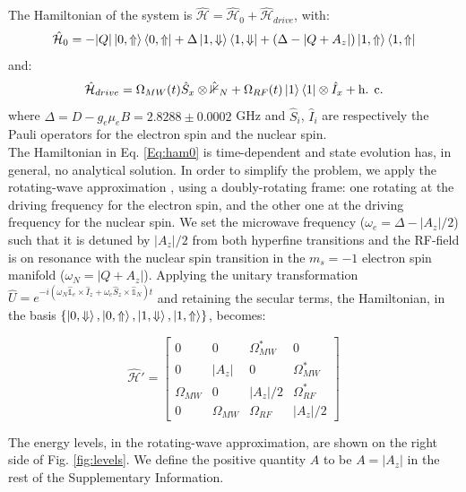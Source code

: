 The Hamiltonian of the system is $\mathcal{\hat{H}}=\mathcal{\hat{H}}_0 +\mathcal{\hat{H}}_{drive}$, with:
\begin{equation}
 \mathcal{\hat{H}}_0 = -|Q| \left|0, \Uparrow\right> \left<0, \Uparrow\right| + \Delta \left|1, \Downarrow\right> \left<1, \Downarrow\right|+(\Delta-|Q+A_z|)\left|1, \Uparrow\right> \left<1, \Uparrow\right|
\end{equation}
and:
\begin{equation}
 \mathcal{\hat{H}}_{drive} = \Omega_{MW} (t)  \hat{S}_{x} \otimes \mathbb{\hat{1}}_N  + \Omega_{RF} (t) \left|1\right>\left<1\right| \otimes \hat{I}_x + \mbox{h. c.}
 \label{Eq:ham0}
\end{equation}
where $\Delta= D -g_e \mu_eB = 2.8288 \pm 0.0002$  GHz and $\hat{S}_i$, $\hat{I}_i$ are respectively the Pauli operators for the electron spin and the nuclear spin. \\

The Hamiltonian in Eq. \ref{Eq:ham0} is time-dependent and state evolution has, in general, no analytical solution. In order to simplify the problem, we apply the rotating-wave approximation \cite{Slichter__1996}, using a doubly-rotating frame: one rotating at the driving frequency for the electron spin, and the other one at the driving frequency for the nuclear spin. We set the microwave  frequency ($\omega_e = \Delta-|A_z|/2$) such that it is detuned by $|A_z|/2$ from both hyperfine transitions and the RF-field is on resonance with the nuclear spin transition in the $m_s=-1$ electron spin manifold ($\omega_N = |Q+A_z|$). Applying the unitary transformation $\hat{U} = e^{-i \left( \omega_N \mathbb{\hat{1}}_e \times \hat{I}_z + \omega_e \hat{S}_z \times \mathbb{\hat{1}}_N \right) t}$ and retaining the secular terms, the Hamiltonian, in the basis $\{ \left|0, \Downarrow\right>, \left|0, \Uparrow\right>, \left|1, \Downarrow\right>, \left|1, \Uparrow\right>  \}$, becomes:

\begin{equation}
\mathcal{\hat{H}'} = \left[
\begin{array}{cccc}
0 & 0 & \Omega^*_{MW} & 0\\
0 & |A_z| & 0 & \Omega^*_{MW}\\
\Omega_{MW} & 0 & |A_z|/2 & \Omega^*_{RF}\\
0 & \Omega_{MW} & \Omega_{RF} & |A_z|/2
\end{array}
\right]
\label{eq:H0_RWA}
\end{equation}

The energy levels, in the rotating-wave approximation, are shown on the right side of Fig. \ref{fig:levels}. We define the positive quantity $A$ to be $A = |A_z|$ in the rest of the Supplementary Information.

